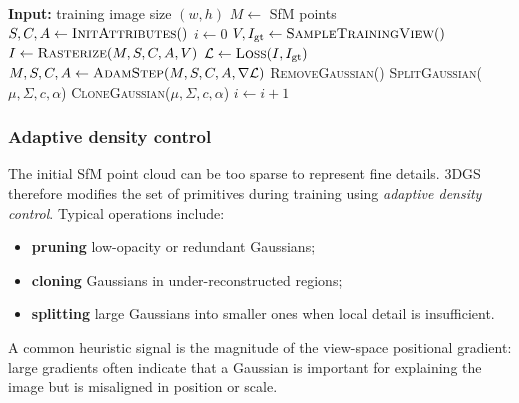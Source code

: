\begin{algorithm}[htbp]
\caption{Optimization and Densification}
\label{alg:optimization_densification_3dgs}
\begin{algorithmic}[1]
\State \textbf{Input:} training image size $(w,h)$
\State $M \gets$ SfM points 
\State $S, C, A \gets \textsc{InitAttributes}()$ 
\State $i \gets 0$
    \State $V, I_{\mathrm{gt}} \gets \textsc{SampleTrainingView}()$ 
    \State $I \gets \textsc{Rasterize}(M,S,C,A,V)$ 
    \State $\mathcal{L} \gets \textsc{Loss}(I, I_{\mathrm{gt}})$
    \State $M,S,C,A \gets \textsc{AdamStep}(M,S,C,A,\nabla \mathcal{L})$
                \State \textsc{RemoveGaussian}() 
            \EndIf
                    \State \textsc{SplitGaussian}($\mu,\Sigma,c,\alpha$) 
                \Else
                    \State \textsc{CloneGaussian}($\mu,\Sigma,c,\alpha$) 
                \EndIf
            \EndIf
        \EndFor
    \EndIf
    \State $i \gets i + 1$
\EndWhile
\end{algorithmic}
\end{algorithm}

\subsubsection{Adaptive density control}
The initial SfM point cloud can be too sparse to represent fine details. 3DGS therefore modifies the set of primitives during training using \emph{adaptive density control}. Typical operations include:
\begin{itemize}
    \item \textbf{pruning} low-opacity or redundant Gaussians;
    \item \textbf{cloning} Gaussians in under-reconstructed regions;
    \item \textbf{splitting} large Gaussians into smaller ones when local detail is insufficient.
\end{itemize}
A common heuristic signal is the magnitude of the view-space positional gradient: large gradients often indicate that a Gaussian is important for explaining the image but is misaligned in position or scale.


